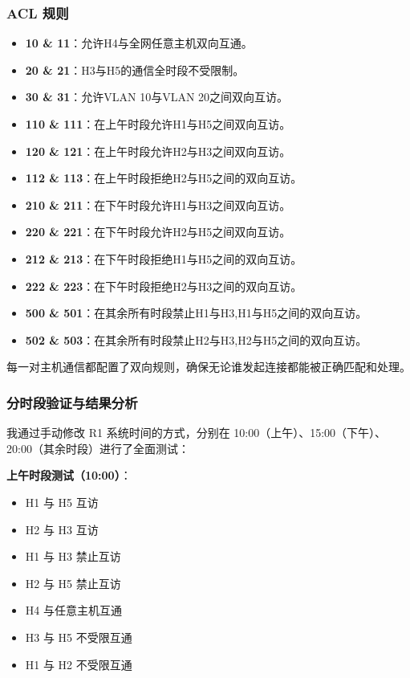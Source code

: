 \documentclass[a4paper]{article}
\begin{document}
\subsubsection{ACL 规则}
    \begin{itemize}
        \item \textbf{10 \& 11}：允许H4与全网任意主机双向互通。
        \item \textbf{20 \& 21}：H3与H5的通信全时段不受限制。
        \item \textbf{30 \& 31}：允许VLAN 10与VLAN 20之间双向互访。
        \item \textbf{110 \& 111}：在上午时段允许H1与H5之间双向互访。
        \item \textbf{120 \& 121}：在上午时段允许H2与H3之间双向互访。
        \item \textbf{112 \& 113}：在上午时段拒绝H2与H5之间的双向互访。
        \item \textbf{210 \& 211}：在下午时段允许H1与H3之间双向互访。
        \item \textbf{220 \& 221}：在下午时段允许H2与H5之间双向互访。
        \item \textbf{212 \& 213}：在下午时段拒绝H1与H5之间的双向互访。
        \item \textbf{222 \& 223}：在下午时段拒绝H2与H3之间的双向互访。
        \item \textbf{500 \& 501}：在其余所有时段禁止H1与H3,H1与H5之间的双向互访。
        \item \textbf{502 \& 503}：在其余所有时段禁止H2与H3,H2与H5之间的双向互访。
    \end{itemize}

每一对主机通信都配置了双向规则，确保无论谁发起连接都能被正确匹配和处理。

\subsubsection{分时段验证与结果分析}

我通过手动修改 R1 系统时间的方式，分别在 10:00（上午）、15:00（下午）、20:00（其余时段）进行了全面测试：

\textbf{上午时段测试（10:00）}：
\begin{itemize}
    \item H1 与 H5 互访
    \item H2 与 H3 互访
    \item H1 与 H3 禁止互访
    \item H2 与 H5 禁止互访
    \item H4 与任意主机互通
    \item H3 与 H5 不受限互通
    \item H1 与 H2 不受限互通
\end{itemize}
\end{document}
